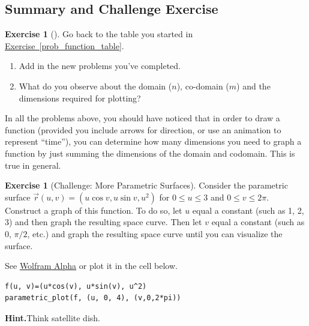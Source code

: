 \documentclass[10pt,]{book}
\theoremstyle{plain}
\theoremstyle{definition}
\theoremstyle{definition}
\theoremstyle{definition}
\theoremstyle{definition}
\newtheorem{exploration}[project]{Exercise}
\theoremstyle{definition}
\numberwithin{equation}{section}
\begin{document}
\subsection[{Summary and Challenge Exercise}]{Summary and Challenge Exercise}\label{subsection-24}
\begin{exploration}[]\label{exploration-108}
Go back to the table you started in \hyperref[prob_function_table]{Exercise~\ref{prob_function_table}}.%
\begin{enumerate}[font=\bfseries,label=(\alph*),ref=\alph*]
\item\label{task-198} Add in the new problems you've completed.%
\item\label{task-199} What do you observe about the domain (\(n\)), co-domain (\(m\)) and the dimensions required for plotting?%
\end{enumerate}
\end{exploration}
In all the problems above, you should have noticed that in order to draw a function (provided you include arrows for direction, or use an animation to represent ``time''), you can determine how many dimensions you need to graph a function by just summing the dimensions of the domain and codomain. This is true in general.%
\begin{exploration}[Challenge: More Parametric Surfaces]\label{second_parametric_surface_example}
Consider the parametric surface \(\vec r(u,v)=(u\cos v, u\sin v, u^2)\) for \(0\leq u\leq 3\) and \(0\leq v\leq 2 \pi\). Construct a graph of this function. To do so, let \(u\) equal a constant (such as 1, 2, 3) and then graph the resulting space curve. Then let \(v\) equal a constant (such as 0, \(\pi/2\), etc.) and graph the resulting space curve until you can visualize the surface.%
\par
See \href{http://wolfr.am/A90cfW}{Wolfram Alpha} or plot it in the cell below.%
\begin{lstlisting}[style=sageinput]
f(u, v)=(u*cos(v), u*sin(v), u^2)
parametric_plot(f, (u, 0, 4), (v,0,2*pi))
\end{lstlisting}
\par\medskip\noindent%
\textbf{Hint.}\quad Think satellite dish.%
\end{exploration}
\typeout{************************************************}
\typeout{************************************************}
\end{document}
